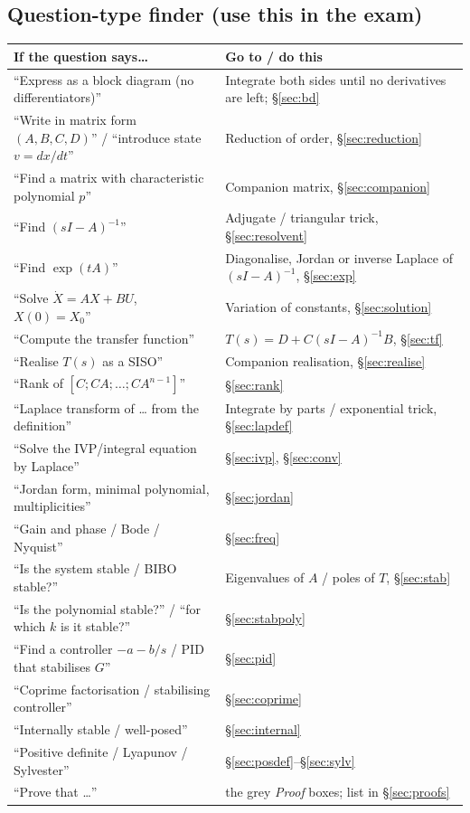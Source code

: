 \subsection{Question-type finder (use this in the exam)}
\begin{center}
\renewcommand{\arraystretch}{1.25}
\begin{tabular}{@{}p{7.3cm}p{8cm}@{}}
\toprule
\textbf{If the question says\dots} & \textbf{Go to / do this}\\\midrule
``Express as a block diagram (no differentiators)'' & Integrate both sides until no derivatives are left; \S\ref{sec:bd}\\
``Write in matrix form $(A,B,C,D)$'' / ``introduce state $v=dx/dt$'' & Reduction of order, \S\ref{sec:reduction}\\
``Find a matrix with characteristic polynomial $p$'' & Companion matrix, \S\ref{sec:companion}\\
``Find $(sI-A)^{-1}$'' & Adjugate / triangular trick, \S\ref{sec:resolvent}\\
``Find $\exp(tA)$'' & Diagonalise, Jordan or inverse Laplace of $(sI-A)^{-1}$, \S\ref{sec:exp}\\
``Solve $\dot X=AX+BU$, $X(0)=X_0$'' & Variation of constants, \S\ref{sec:solution}\\
``Compute the transfer function'' & $T(s)=D+C(sI-A)^{-1}B$, \S\ref{sec:tf}\\
``Realise $T(s)$ as a SISO'' & Companion realisation, \S\ref{sec:realise}\\
``Rank of $[C;CA;\dots;CA^{n-1}]$'' & \S\ref{sec:rank}\\
``Laplace transform of \dots{} from the definition'' & Integrate by parts / exponential trick, \S\ref{sec:lapdef}\\
``Solve the IVP/integral equation by Laplace'' & \S\ref{sec:ivp}, \S\ref{sec:conv}\\
``Jordan form, minimal polynomial, multiplicities'' & \S\ref{sec:jordan}\\
``Gain and phase / Bode / Nyquist'' & \S\ref{sec:freq}\\
``Is the system stable / BIBO stable?'' & Eigenvalues of $A$ / poles of $T$, \S\ref{sec:stab}\\
``Is the polynomial stable?'' / ``for which $k$ is it stable?'' & \S\ref{sec:stabpoly}\\
``Find a controller $-a-b/s$ / PID that stabilises $G$'' & \S\ref{sec:pid}\\
``Coprime factorisation / stabilising controller'' & \S\ref{sec:coprime}\\
``Internally stable / well-posed'' & \S\ref{sec:internal}\\
``Positive definite / Lyapunov / Sylvester'' & \S\ref{sec:posdef}--\S\ref{sec:sylv}\\
``Prove that \dots'' & the grey \emph{Proof} boxes; list in \S\ref{sec:proofs}\\
\bottomrule
\end{tabular}
\end{center}

